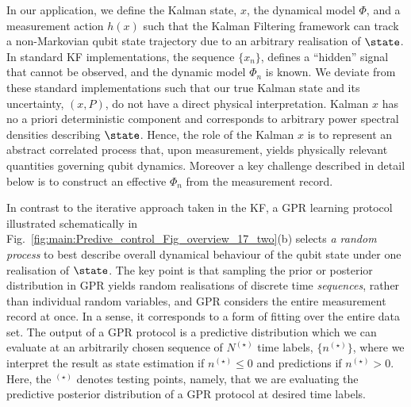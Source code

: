  In our application, we define the Kalman state, $x$, the dynamical model $\Phi$, and a measurement action $h(x)$ such that the Kalman Filtering framework can track a non-Markovian qubit state trajectory due to an arbitrary realisation of $\state$. In standard KF implementations, the sequence $\{x_n\}$, defines a ``hidden'' signal that cannot be observed, and the dynamic model $\Phi_n$ is known.  We deviate from these standard implementations such that our true Kalman state and its uncertainty, $(x, P)$, do not have a direct physical interpretation.  Kalman $x$ has no a priori deterministic component and corresponds to arbitrary power spectral densities describing $\state$. Hence, the role of the Kalman $x$ is to represent an abstract correlated process that, upon measurement, yields physically relevant quantities governing qubit dynamics.  Moreover a key challenge described in detail below is to construct an effective $\Phi_{n}$ from the measurement record.   

In contrast to the iterative approach taken in the KF, a GPR learning protocol illustrated schematically in Fig.~\ref{fig:main:Predive_control_Fig_overview_17_two}(b) selects \textit{a random process} to best describe overall dynamical behaviour of the qubit state under one realisation of $\state$. The key point is that sampling the prior or posterior distribution in GPR yields random realisations of discrete time \textit{sequences}, rather than individual random variables, and GPR considers the entire measurement record at once.  In a sense, it corresponds to a form of fitting over the entire data set.  The output of a GPR protocol is a predictive distribution which we can evaluate at an arbitrarily chosen sequence of $N^{(\star)}$ time labels, $\{ n^{(\star)} \}$, where we interpret the result as state estimation if $n^{(\star)} \leq 0$ and predictions if $n^{(\star)}>0$. Here, the ${}^{(\star)}$ denotes testing points, namely, that we are evaluating the predictive posterior distribution of a GPR protocol at desired time labels.

